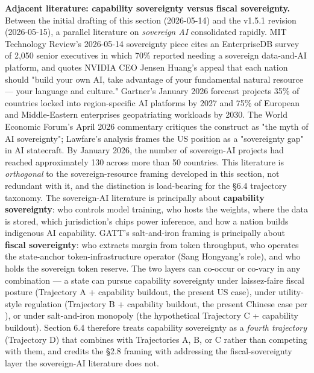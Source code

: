 \documentclass[11pt,a4paper]{article}
\begin{document}
\textbf{Adjacent literature: capability sovereignty versus fiscal sovereignty.} Between the initial drafting of this section (2026-05-14) and the v1.5.1 revision (2026-05-15), a parallel literature on \emph{sovereign AI} consolidated rapidly. MIT Technology Review's 2026-05-14 sovereignty piece \cite{mit2026sovereignty} cites an EnterpriseDB survey of 2,050 senior executives in which 70\% reported needing a sovereign data-and-AI platform, and quotes NVIDIA CEO Jensen Huang's appeal that each nation should "build your own AI, take advantage of your fundamental natural resource --- your language and culture." Gartner's January 2026 forecast \cite{gartner2026regional} projects 35\% of countries locked into region-specific AI platforms by 2027 and 75\% of European and Middle-Eastern enterprises geopatriating workloads by 2030. The World Economic Forum's April 2026 commentary \cite{wef2026sovereigntymyth} critiques the construct as "the myth of AI sovereignty"; Lawfare's analysis \cite{lawfare2026sovereigntygap} frames the US position as a "sovereignty gap" in AI statecraft. By January 2026, the number of sovereign-AI projects had reached approximately 130 across more than 50 countries. This literature is \emph{orthogonal} to the sovereign-resource framing developed in this section, not redundant with it, and the distinction is load-bearing for the §6.4 trajectory taxonomy. The sovereign-AI literature is principally about \textbf{capability sovereignty}: who controls model training, who hosts the weights, where the data is stored, which jurisdiction's chips power inference, and how a nation builds indigenous AI capability. GATT's salt-and-iron framing is principally about \textbf{fiscal sovereignty}: who extracts margin from token throughput, who operates the state-anchor token-infrastructure operator (Sang Hongyang's role), and who holds the sovereign token reserve. The two layers can co-occur or co-vary in any combination --- a state can pursue capability sovereignty under laissez-faire fiscal posture (Trajectory A + capability buildout, the present US case), under utility-style regulation (Trajectory B + capability buildout, the present Chinese case per \cite{chinaminutes2026electricity}), or under salt-and-iron monopoly (the hypothetical Trajectory C + capability buildout). Section 6.4 therefore treats capability sovereignty as a \emph{fourth trajectory} (Trajectory D) that combines with Trajectories A, B, or C rather than competing with them, and credits the §2.8 framing with addressing the fiscal-sovereignty layer the sovereign-AI literature does not.
\end{document}
